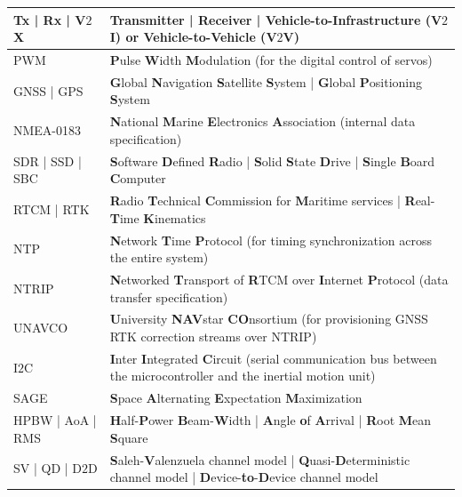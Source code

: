 \documentclass[12pt, draftcls, onecolumn]{IEEEtran}
\begin{document}
\begin{table} [tb]
	\centering
	\scriptsize
	\begin{tabular}{|l||l|}
		\hline
        Tx | Rx | V$2$X & Transmitter | Receiver | \textbf{V}ehicle-to-\textbf{I}nfrastructure (V$2$I) or \textbf{V}ehicle-to-\textbf{V}ehicle (V$2$V)\\
		\hline
        \hline
        PWM & \textbf{P}ulse \textbf{W}idth \textbf{M}odulation (for the digital control of servos)\\
		\hline
        GNSS | GPS & \textbf{G}lobal \textbf{N}avigation \textbf{S}atellite \textbf{S}ystem | \textbf{G}lobal \textbf{P}ositioning \textbf{S}ystem\\
        \hline
		NMEA-0183 & \textbf{N}ational \textbf{M}arine \textbf{E}lectronics \textbf{A}ssociation (internal data specification)\\
		\hline
        SDR | SSD | SBC & \textbf{S}oftware \textbf{D}efined \textbf{R}adio | \textbf{S}olid \textbf{S}tate \textbf{D}rive | \textbf{S}ingle \textbf{B}oard \textbf{C}omputer\\
		\hline
        RTCM | RTK & \textbf{R}adio \textbf{T}echnical \textbf{C}ommission for \textbf{M}aritime services | \textbf{R}eal-\textbf{T}ime \textbf{K}inematics\\
		\hline
        NTP & \textbf{N}etwork \textbf{T}ime \textbf{P}rotocol (for timing synchronization across the entire system)\\
        \hline
		NTRIP & \textbf{N}etworked \textbf{T}ransport of \textbf{R}TCM over \textbf{I}nternet \textbf{P}rotocol (data transfer specification)\\
		\hline
		UNAVCO & \textbf{U}niversity \textbf{NAV}star \textbf{CO}nsortium (for provisioning GNSS RTK correction streams over NTRIP)\\
		\hline
		I$2$C & \textbf{I}nter \textbf{I}ntegrated \textbf{C}ircuit (serial communication bus between the microcontroller and the inertial motion unit)\\
		\hline
        \hline
        SAGE & \textbf{S}pace \textbf{A}lternating \textbf{E}xpectation \textbf{M}aximization\\
		\hline
        HPBW | AoA | RMS & \textbf{H}alf-\textbf{P}ower \textbf{B}eam-\textbf{W}idth | \textbf{A}ngle \textbf{o}f \textbf{A}rrival | \textbf{R}oot \textbf{M}ean \textbf{S}quare\\
		\hline
        SV | QD | D$2$D & \textbf{S}aleh-\textbf{V}alenzuela channel model | \textbf{Q}uasi-\textbf{D}eterministic channel model | \textbf{D}evice-\textbf{to}-\textbf{D}evice channel model\\

\end{tabular}
\end{table}
\end{document}
